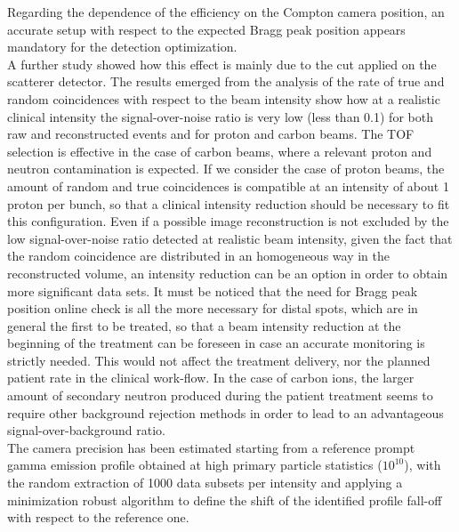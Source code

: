 Regarding the dependence of the efficiency on the Compton camera position, an accurate setup with respect to the expected Bragg peak position appears mandatory for the detection optimization.\\
A further study showed how this effect is mainly due to the cut applied on the scatterer detector. 
The results emerged from the analysis of the rate of true and random coincidences with respect to the beam intensity show how at a realistic clinical intensity the signal-over-noise ratio is very low (less than 0.1) for both raw and reconstructed events and for proton and carbon beams. The TOF selection is effective in the case of carbon beams, where a relevant proton and neutron contamination is expected. If we consider the case of proton beams, the amount of random and true coincidences is compatible at an intensity of about 1 proton per bunch, so that a clinical intensity reduction should be necessary to fit this configuration. Even if a possible image reconstruction is not excluded by the low signal-over-noise ratio detected at realistic beam intensity, given the fact that the random coincidence are distributed in an homogeneous way in the reconstructed volume, an intensity reduction can be an option in order to obtain more significant data sets. It must be noticed that the need for Bragg peak position online check is all the more necessary for distal spots, which are in general the first to be treated, so that a beam intensity reduction at the beginning of the treatment can be foreseen in case an accurate monitoring is strictly needed. This would not affect the treatment delivery, nor the planned patient rate in the clinical work-flow. 
In the case of carbon ions, the larger amount of secondary neutron produced during the patient treatment seems to require other background rejection methods in order to lead to an advantageous signal-over-background ratio.\\
The camera precision has been estimated starting from a reference prompt gamma emission profile obtained at high primary particle statistics ($10^{10}$), with the random extraction of 1000 data subsets per intensity and applying a minimization robust algorithm to define the shift of the identified profile fall-off with respect to the reference one.\\
